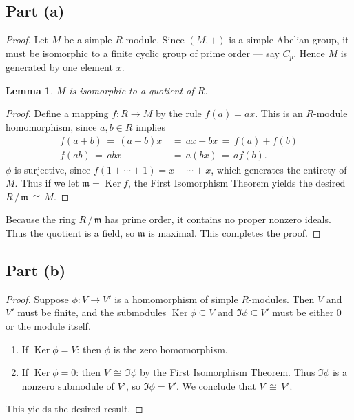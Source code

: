 \documentclass[11pt]{article}
\newtheorem{lemma}{Lemma}
\newcommand{\Ker}{\operatorname{Ker}}
\begin{document}
\subsection{Part (a)}

\begin{proof}
  Let $M$ be a simple $R$-module. Since $(M, +)$ is a simple Abelian group, it must be isomorphic to a finite cyclic group of prime order --- say $C_{p}$. Hence $M$ is generated by one element $x$.
  
  \begin{adjustwidth}{0.5cm}{}
    \begin{lemma}
      $M$ is isomorphic to a quotient of $R$.
    \end{lemma}
    \begin{proof}\renewcommand{\qedsymbol}{}
      Define a mapping $f : R \to M$ by the rule $f(a) = ax$. This is an $R$-module homomorphism, since $a, b \in R$ implies
      \begin{align*}
        f(a + b) \, = \, (a + b)x \, &= \, ax + bx \, = \, f(a) + f(b) \\
        f(ab) \, = \, abx \, &= \, a(bx) \, = \, a f(b).
      \end{align*}
      $\phi$ is surjective, since $f(1 + \cdots + 1) = x + \cdots + x$, which generates the entirety of $M$. Thus if we let $\mathfrak{m} = \Ker f$, the First Isomorphism Theorem yields the desired $R \, / \, \mathfrak{m} \, \cong \, M$.
    \end{proof}
  \end{adjustwidth}
  
  Because the ring $R \, / \, \mathfrak{m}$ has prime order, it contains no proper nonzero ideals. Thus the quotient is a field, so $\mathfrak{m}$ is maximal. This completes the proof.
\end{proof}


\subsection{Part (b)}

\begin{proof}
  Suppose $\phi : V \to V'$ is a homomorphism of simple $R$-modules. Then $V$ and $V'$ must be finite, and the submodules $\Ker \phi \subseteq V$ and $\Im \phi \subseteq V'$ must be either $0$ or the module itself.
  \begin{enumerate}
    \item If $\Ker \phi = V$: then $\phi$ is the zero homomorphism.
    \item If $\Ker \phi = 0$: then $V \, \cong \, \Im \phi$ by the First Isomorphism Theorem. Thus $\Im \phi$ is a nonzero submodule of $V'$, so $\Im \phi = V'$. We conclude that $V \, \cong \, V'$.
  \end{enumerate}
  This yields the desired result.
\end{proof}
\end{document}
